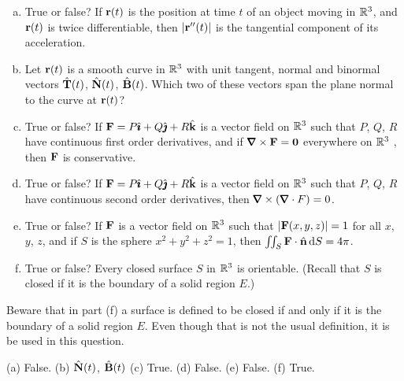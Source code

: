 \begin{question}[M317 2011D]  %

\begin{enumerate}[(a)]
\item
True or false? If $\mathbf{r}(t)$ is the position at time $t$ of an object moving 
in $\mathbb{R}^3$, and $\mathbf{r}(t)$ is twice differentiable, then $|\mathbf{r}''(t)|$ is 
the tangential component of its acceleration.

\item
Let $\mathbf{r}(t)$ is a smooth curve in $\mathbb{R}^3$ with unit tangent, normal 
and binormal vectors $\hat{\mathbf{T}}(t)$, $\hat{\mathbf{N}}(t)$, $\hat{\mathbf{B}}(t)$. Which two of these 
vectors span the plane normal to the curve at $\mathbf{r}(t)$?

\item
True or false? If $\mathbf{F} = P\hat{\pmb{\imath}} + Q\hat{\pmb{\jmath}} + R\hat{\mathbf{k}}$ is a vector field on 
$\mathbb{R}^3$ such that $P$, $Q$, $R$ have continuous first order derivatives, 
and if $\vnabla\times\vF = \vZero$ everywhere on $\mathbb{R}^3$ , then $\mathbf{F}$ 
is conservative.

\item
True or false? If $\mathbf{F} = P\hat{\pmb{\imath}} + Q\hat{\pmb{\jmath}} + R\hat{\mathbf{k}}$  is a vector field on 
$\mathbb{R}^3$ such that $P$, $Q$, $R$ have continuous second order derivatives, 
then $\vnabla\times(\vnabla\cdot F) = 0$.

\item
True or false? If $\mathbf{F}$ is a vector field on $\mathbb{R}^3$ such that 
$|\mathbf{F}(x, y, z)| = 1$ for all $x$, $y$, $z$, and
if $S$ is the sphere $x^2 + y^2 + z^2 = 1$, then 
$\iint_S \mathbf{F} \cdot\hat{\mathbf{n}}\,\mathrm{d}S = 4\pi$.

\item
True or false? Every closed surface $S$ in $\mathbb{R}^3$ is orientable. 
(Recall that $S$ is closed if it is the boundary of a solid region $E$.)

\end{enumerate}
\end{question}

\begin{hint} 
Beware that in part (f) a surface is defined to be closed if and only if it is
the boundary of a solid region $E$. Even though that is not the usual 
definition, it is be used in this question. 
\end{hint}

\begin{answer} 
(a) False.\qquad
(b) $\hat{\mathbf{N}}(t)$, $\hat{\mathbf{B}}(t)$\qquad
(c) True.\qquad
(d) False.\qquad
(e) False.\qquad
(f) True.

\end{answer}

